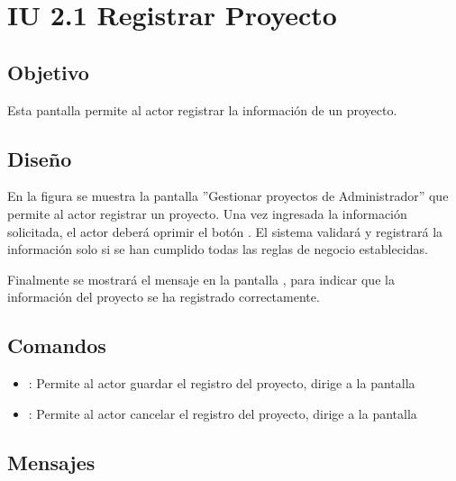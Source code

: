 \section{IU 2.1 Registrar Proyecto}

\subsection{Objetivo}
	Esta pantalla permite al actor registrar la información de un proyecto.
\subsection{Diseño}
	En la figura  se muestra la pantalla ''Gestionar proyectos de Administrador'' que permite al actor registrar un proyecto.
	Una vez ingresada la información solicitada, el actor deberá oprimir el botón  . El sistema validará y registrará la información solo si se han cumplido todas las reglas de negocio establecidas.
	
	Finalmente se mostrará el mensaje  en la pantalla , para indicar que la información del proyecto se ha registrado correctamente.

\subsection{Comandos}
\begin{itemize}
	\item {}: Permite al actor guardar el registro del proyecto, dirige a la pantalla 
	\item {}: Permite al actor cancelar el registro del proyecto, dirige a la pantalla 
\end{itemize}

\subsection{Mensajes}


